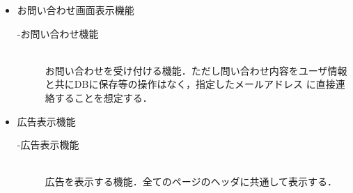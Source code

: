 \begin{itemize}
\begin{description}
    \end{description}
    \item お問い合わせ画面表示機能
    \begin{description}
        \item[-お問い合わせ機能]\mbox{}\\
            お問い合わせを受け付ける機能．ただし問い合わせ内容をユーザ情報と共にDBに保存等の操作はなく，指定したメールアドレス
            に直接連絡することを想定する． 
    \end{description}
    \item 広告表示機能
    \begin{description}
        \item[-広告表示機能]\mbox{}\\
            広告を表示する機能．全てのページのヘッダに共通して表示する． 
    \end{description}
\end{itemize}  

\clearpage

